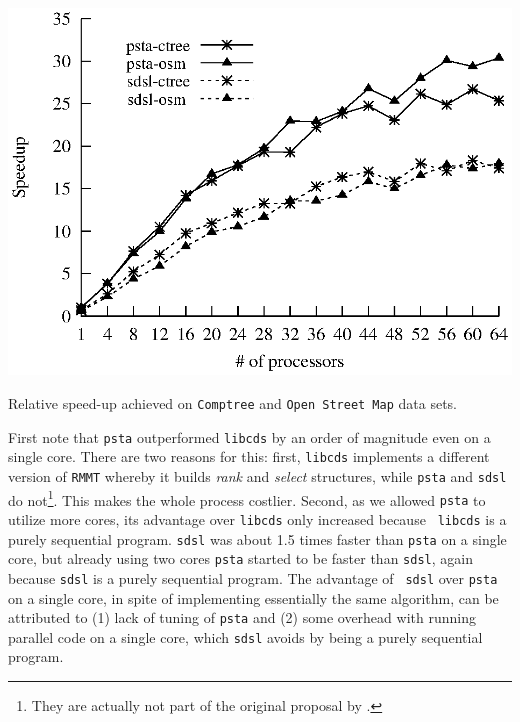 \begin{table}[t]
{{\begin{minipage}[b]{0.48\hsize}
      \includegraphics[scale=0.5]{./images/speedup}
      \caption{Relative speed-up achieved on {\tt Comptree} and {\tt Open Street Map} data sets.}
      \label{fig:speedup}

    \end{minipage}
}}
\end{table}

First note that {\tt psta} outperformed {\tt libcds} by an order of
magnitude even on a single core. There are two reasons for this:
first, \verb+libcds+ implements a different version of \verb+RMMT+
whereby it builds {\em rank} and {\em select} structures, while
\verb+psta+ and \verb+sdsl+ do not\footnote{They are actually not part
  of the original proposal by
  \cite{Navarro:2014:FFS:2620785.2601073}.}. This makes the whole
process costlier. Second, as we allowed {\tt psta} to utilize more
cores, its advantage over {\tt libcds} only increased because {\tt
  libcds} is a purely sequential program.  {\tt sdsl} was about 1.5
times faster than {\tt psta} on a single core, but already using two
cores {\tt psta} started to be faster than {\tt sdsl}, again because
{\tt sdsl} is a purely sequential program.  The advantage of {\tt
  sdsl} over {\tt psta} on a single core, in spite of implementing
essentially the same algorithm, can be attributed to (1) lack of
tuning of {\tt psta} and (2) some overhead with running parallel code
on a single core, which {\tt sdsl} avoids by being a purely sequential
program.


